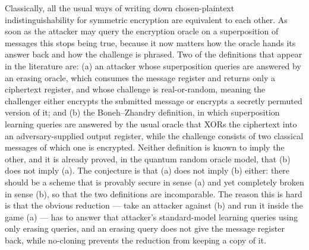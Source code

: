 \documentclass{aicr-conjecture}
\begin{document}

\vspace{0.4em}

\begin{informalconjecture}
Classically, all the usual ways of writing down chosen-plaintext
indistinguishability for symmetric encryption are equivalent to each
other. As soon as the attacker may query the encryption oracle on a
superposition of messages this stops being true, because it now matters
how the oracle hands its answer back and how the challenge is phrased.
Two of the definitions that appear in the literature are: (a) an
attacker whose superposition queries are answered by an erasing oracle,
which consumes the message register and returns only a ciphertext
register, and whose challenge is real-or-random, meaning the challenger
either encrypts the submitted message or encrypts a secretly permuted
version of it; and (b) the Boneh--Zhandry definition, in which
superposition learning queries are answered by the usual oracle that
XORs the ciphertext into an adversary-supplied output register, while
the challenge consists of two classical messages of which one is
encrypted. Neither definition is known to imply the other, and it is
already proved, in the quantum random oracle model, that (b) does not
imply (a). The conjecture is that (a) does not imply (b) either: there
should be a scheme that is provably secure in sense (a) and yet
completely broken in sense (b), so that the two definitions are
incomparable. The reason this is hard is that the obvious reduction ---
take an attacker against (b) and run it inside the game (a) --- has to
answer that attacker's standard-model learning queries using only
erasing queries, and an erasing query does not give the message register
back, while no-cloning prevents the reduction from keeping a copy of it.
\end{informalconjecture}
\end{document}
